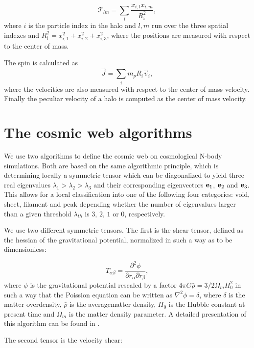 \documentclass[usenatbib]{mn2e}
\begin{document}
\begin{equation}
{\mathcal T}_{lm} = \sum_{i}\frac{x_{i,l}x_{i,m}}{R_i^2}, 
\end{equation}
where $i$ is the particle index in the halo and $l,m$ run over the
three spatial indexes  and $R_i^2 = x_{i,1}^2 + x_{i,2}^2 +
x_{i,3}^2$, where the positions are measured with respect to the
center of mass.

The spin is calculated as
\begin{equation}
\vec{J} = \sum_{i}m_p{R_i}\vec{v}_i, 
\end{equation}
where the velocities are also measured with respect to the center of
mass velocity. Finally the peculiar velocity of a halo is computed as
the center of mass velocity.



\section{The cosmic web algorithms}
\label{sec:algorithms}
We use two algorithms to define the cosmic web on cosmological N-body
simulations. Both are based on the same algorithmic principle, which
is determining locally a symmetric tensor which can be diagonalized to yield
three real eigenvalues $\lambda_1>\lambda_2>\lambda_3$ and their
corresponding eigenvectors ${\bf e}_{1}$, ${\bf e}_2$ and ${\bf
  e}_3$. This allows for a local classification into one of the
following four categories: void, sheet, filament and peak depending
whether the number of eigenvalues larger than a given threshold
$\lambda_{th}$ is $3$, $2$, $1$ or $0$, respectively.

We use two different symmetric tensors. The first is the shear tensor,
defined as the hessian of the gravitational potential, normalized in
such a way as to be dimensionless:

\begin{equation}
T_{\alpha\beta} = \frac{\partial^2\phi}{\partial
  r_{\alpha}\partial r_{\beta}}, 
\end{equation}
%
where $\phi$ is the gravitational potential rescaled by a factor $4\pi
G\bar{\rho}=3/2\Omega_m H_{0}^2$ in such a way that the Poission
equation can be written as $\nabla^{2}\phi  = \delta$, where $\delta$
is the matter overdensity, $\bar{\rho}$ is the averagematter density,
$H_{0}$ is the Hubble constant at present time and $\Omega_m$ is the
matter density parameter. A detailed presentation of this algorithm
can be found in \citep{Tweb}.

The second tensor is the velocity shear:
\end{document}
